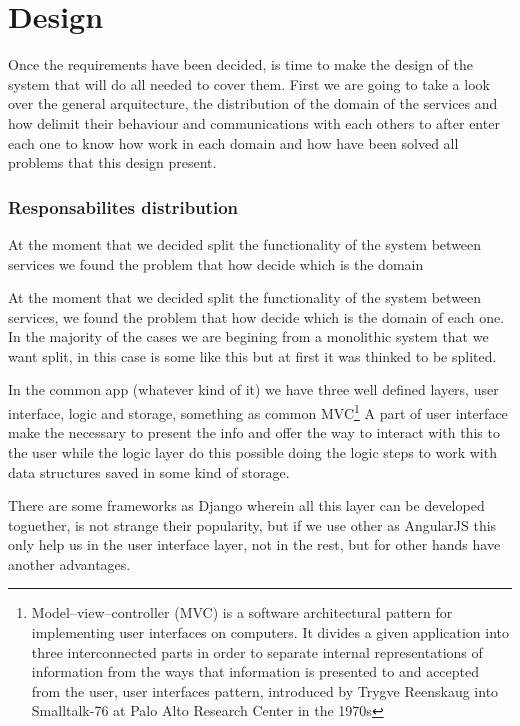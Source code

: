 \chapter{Design}

Once the requirements have been decided, is time to make the design of the system
 that will do all needed to cover them. First we are going to take a look over
 the general arquitecture, the distribution of the domain of the services and
 how delimit their behaviour and communications with each others to after enter
 each one to know how work in each domain and how have been solved all problems
 that this design present.

\subsection{Responsabilites distribution}

At the moment that we decided split the functionality of the system between
services we found the problem that how decide which is the domain

At the moment that we decided split the functionality of the system between
services, we found the problem that how decide which is the domain of each one.
In the majority of the cases we are begining from a monolithic system that we
want split, in this case is some like this but at first it was thinked to be splited.

In the common app (whatever kind of it) we have three well defined layers, user
interface, logic and storage, something as common MVC\footnote{Model–view–controller
(MVC) is a software architectural pattern for implementing user interfaces on
computers. It divides a given application into three interconnected parts in
order to separate internal representations of information from the ways that
information is presented to and accepted from the user, user interfaces pattern,
introduced by Trygve Reenskaug into Smalltalk-76 at Palo Alto Research Center in the 1970s}
A part of user interface make the necessary to present the info and offer the
way to interact with this to the user while the logic layer do this possible
doing the logic steps to work with data structures saved in some kind of storage.

There are some frameworks as Django wherein all this layer can be developed
toguether, is not strange their popularity, but if we use other as AngularJS
this only help us in the user interface layer, not in the rest, but for other
hands have another advantages.

